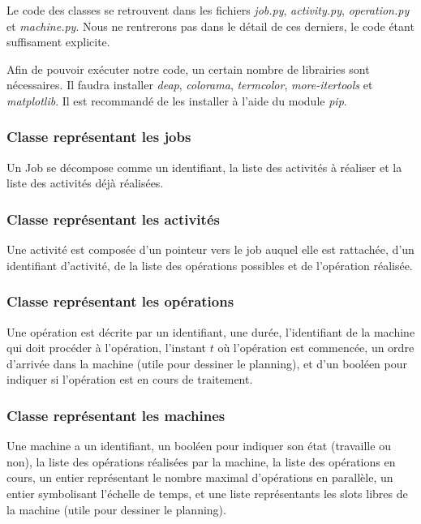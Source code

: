 Le code des classes se retrouvent dans les fichiers \textit{job.py}, \textit{activity.py}, \textit{operation.py} et \textit{machine.py}. Nous ne rentrerons pas dans le détail de ces derniers, le code étant suffisament explicite.

Afin de pouvoir exécuter notre code, un certain nombre de librairies sont nécessaires. Il faudra installer \textit{deap}, \textit{colorama}, \textit{termcolor}, \textit{more-itertools} et \textit{matplotlib}. Il est recommandé de les installer à l'aide du module \textit{pip}.

\subsubsection{Classe représentant les jobs}

Un Job se décompose comme un identifiant, la liste des activités à réaliser et la liste des activités déjà réalisées.

\subsubsection{Classe représentant les activités}

Une activité est composée d'un pointeur vers le job auquel elle est rattachée, d'un identifiant d'activité, de la liste des opérations possibles et de l'opération réalisée.

\subsubsection{Classe représentant les opérations}

Une opération est décrite par un identifiant, une durée, l'identifiant de la machine qui doit procéder à l'opération, l'instant $t$ où l'opération est commencée, un ordre d'arrivée dans la machine (utile pour dessiner le planning), et d'un booléen pour indiquer si l'opération est en cours de traitement.

\subsubsection{Classe représentant les machines}

Une machine a un identifiant, un booléen pour indiquer son état (travaille ou non), la liste des opérations réalisées par la machine, la liste des opérations en cours, un entier représentant le nombre maximal d'opérations en parallèle, un entier symbolisant l'échelle de temps, et une liste représentants les slots libres de la machine (utile pour dessiner le planning).